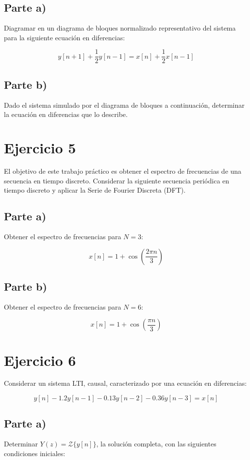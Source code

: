 \documentclass[a4paper,12pt]{report}
\begin{document}
\section{Parte a)}
Diagramar en un diagrama de bloques normalizado representativo del sistema para la siguiente ecuación en diferencias:

\[
y[n+1] + \frac{1}{2} y[n-1] = x[n] + \frac{1}{2} x[n-1]
\]

\section{Parte b)}
Dado el sistema simulado por el diagrama de bloques a continuación, determinar la ecuación en diferencias que lo describe.

\chapter{Ejercicio 5}
El objetivo de este trabajo práctico es obtener el espectro de frecuencias de una secuencia en tiempo discreto. Considerar la siguiente secuencia periódica en tiempo discreto y aplicar la Serie de Fourier Discreta (DFT).

\section{Parte a)}
Obtener el espectro de frecuencias para $N = 3$:

\[
x[n] = 1 + \cos \left( \frac{2\pi n}{3} \right)
\]

\section{Parte b)}
Obtener el espectro de frecuencias para $N = 6$:

\[
x[n] = 1 + \cos \left( \frac{\pi n}{3} \right)
\]

\chapter{Ejercicio 6}
Considerar un sistema LTI, causal, caracterizado por una ecuación en diferencias:

\[
y[n] - 1.2 y[n-1] - 0.13 y[n-2] - 0.36 y[n-3] = x[n]
\]

\section{Parte a)}
Determinar $Y(z) = \mathcal{Z}\{y[n]\}$, la solución completa, con las siguientes condiciones iniciales:
\end{document}

